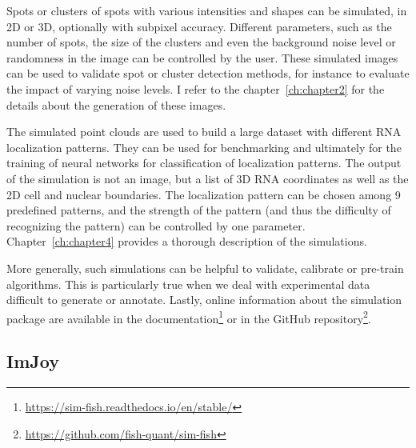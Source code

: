 Spots or clusters of spots with various intensities and shapes can be simulated, in 2D or 3D, optionally with subpixel accuracy.
Different parameters, such as the number of spots, the size of the clusters and even the background noise level or randomness in the image can be controlled by the user.
These simulated images can be used to validate spot or cluster detection methods, for instance to evaluate the impact of varying noise levels.
I refer to the chapter~\ref{ch:chapter2} for the details about the generation of these images.

The simulated point clouds are used to build a large dataset with different RNA localization patterns.
They can be used for benchmarking and ultimately for the training of neural networks for classification of localization patterns.
The output of the simulation is not an image, but a list of 3D \ac{RNA} coordinates as well as the 2D cell and nuclear boundaries.
The localization pattern can be chosen among 9 predefined patterns, and the strength of the pattern (and thus the difficulty of recognizing the pattern) can be controlled by one parameter.
Chapter~\ref{ch:chapter4} provides a thorough description of the simulations.

More generally, such simulations can be helpful to validate, calibrate or pre-train algorithms.
This is particularly true when we deal with experimental data difficult to generate or annotate.
Lastly, online information about the simulation package are available in the documentation\footnote{\url{https://sim-fish.readthedocs.io/en/stable/}} or in the GitHub repository\footnote{\url{https://github.com/fish-quant/sim-fish}}.

\subsection{ImJoy}
\label{subsec:imjoy}

